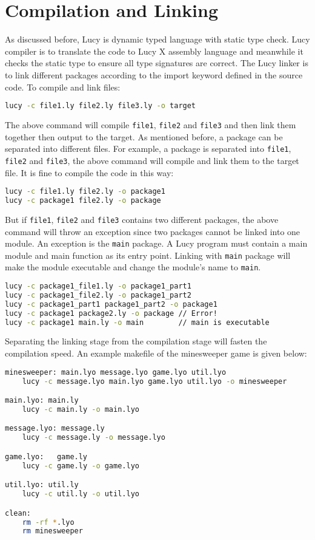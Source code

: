 \section{Compilation and Linking}
As discussed before, Lucy is dynamic typed language with static type check. Lucy compiler is to translate the code to Lucy X assembly language and meanwhile it checks the static type to ensure all type signatures are correct. The Lucy linker is to link different packages according to the import keyword defined in the source code. To compile and link files:
\begin{lstlisting}[language=bash]
lucy -c file1.ly file2.ly file3.ly -o target
\end{lstlisting}
The above command will compile \texttt{file1}, \texttt{file2} and \texttt{file3} and then link them together then output to the target. As mentioned before, a package can be separated into different files. For example, a package is separated into \texttt{file1}, \texttt{file2} and \texttt{file3}, the above command will compile and link them to the target file. It is fine to compile the code in this way:
\begin{lstlisting}[language=bash]
lucy -c file1.ly file2.ly -o package1
lucy -c package1 file2.ly -o package
\end{lstlisting}
But if \texttt{file1}, \texttt{file2} and \texttt{file3} contains two different packages, the above command will throw an exception since two packages cannot be linked into one module. An exception is the \texttt{main} package. A Lucy program must contain a main module and main function as its entry point. Linking with \texttt{main} package will make the module executable and change the module's name to \texttt{main}.
\begin{lstlisting}[language=bash]
lucy -c package1_file1.ly -o package1_part1
lucy -c package1_file2.ly -o package1_part2
lucy -c package1_part1 package1_part2 -o package1
lucy -c package1 package2.ly -o package // Error!
lucy -c package1 main.ly -o main        // main is executable
\end{lstlisting}
Separating the linking stage from the compilation stage will fasten the compilation speed. An example makefile of the minesweeper game is given below:
 \begin{lstlisting}[language=bash]
 minesweeper: main.lyo message.lyo game.lyo util.lyo
	lucy -c message.lyo main.lyo game.lyo util.lyo -o minesweeper

main.lyo: main.ly
	lucy -c main.ly -o main.lyo

message.lyo: message.ly
	lucy -c message.ly -o message.lyo

game.lyo:	game.ly
	lucy -c game.ly -o game.lyo

util.lyo: util.ly
	lucy -c util.ly -o util.lyo

clean:
	rm -rf *.lyo
	rm minesweeper
 \end{lstlisting}

